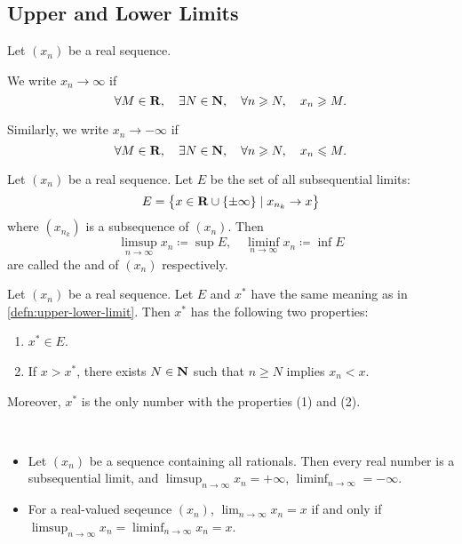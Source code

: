 \subsection{Upper and Lower Limits}
Let $(x_n)$ be a real sequence.

\begin{definition}
We write $x_n\to\infty$ if
\[\forall M\in\mathbf R,\quad\exists N\in\mathbf N,\quad\forall n\geqslant N,\quad x_n\geqslant M.\]

Similarly, we write $x_n\to-\infty$ if 
\[\forall M\in\mathbf R,\quad\exists N\in\mathbf N,\quad\forall n\geqslant N,\quad x_n\leqslant M.\]
\end{definition}

\begin{definition}\label{defn:upper-lower-limit}
Let $(x_n)$ be a real sequence. Let $E$ be the set of all subsequential limits:
\[E=\left\{x\in\mathbf R\cup\{\pm\infty\}\mid x_{n_k}\to x\right\}\]
where $(x_{n_k})$ is a subsequence of $(x_n)$. Then
\[\limsup_{n\to\infty}x_n\coloneqq\sup E,\quad\liminf_{n\to\infty}x_n\coloneqq\inf E\]
are called the  and  of $(x_n)$ respectively.
\end{definition}

\begin{proposition}
Let $(x_n)$ be a real sequence. Let $E$ and $x^*$ have the same meaning as in \cref{defn:upper-lower-limit}. Then $x^*$ has the following two properties:
\begin{enumerate}[label=(\arabic*)]
\item $x^*\in E$.
\item If $x>x^*$, there exists $N\in\mathbf N$ such that $n\ge N$ implies $x_n<x$.
\end{enumerate}
Moreover, $x^*$ is the only number with the properties (1) and (2).
\end{proposition}

\begin{example} \
\begin{itemize}
\item Let $(x_n)$ be a sequence containing all rationals. Then every real number is a subsequential limit, and $\limsup_{n\to\infty}x_n=+\infty$, $\liminf_{n\to\infty}=-\infty$.
\item For a real-valued seqeunce $(x_n)$, $\lim_{n\to\infty}x_n=x$ if and only if $\limsup_{n\to\infty}x_n=\liminf_{n\to\infty}x_n=x$.
\end{itemize}
\end{example}

